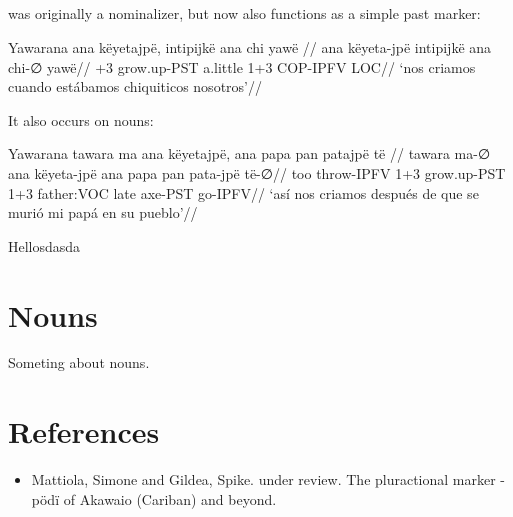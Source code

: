 \documentclass{article}
\begin{document}
\subsection{}

 was originally a nominalizer, but now also functions as a
simple past marker:

 Yawarana 
\begingl
\glpreamble ana këyetajpë, intipijkë ana chi yawë //
\gla ana këyeta-jpë intipijkë ana chi-∅ yawë//
+3 grow.up-PST a.little 1+3 COP-IPFV LOC//
\glft ‘nos criamos cuando estábamos chiquiticos nosotros’//  
\endgl 
\xe

It also occurs on nouns:

 Yawarana 
\begingl
\glpreamble tawara ma ana këyetajpë, ana papa pan patajpë të //
\gla tawara ma-∅ ana këyeta-jpë ana papa pan pata-jpë të-∅//
\glb too throw-IPFV 1+3 grow.up-PST 1+3 father:VOC late axe-PST go-IPFV//
\glft ‘así nos criamos después de que se murió mi papá en su pueblo’//  
\endgl 
\xe

Hellosdasda

\section{Nouns}

Someting about nouns.

\section{References}

\begin{itemize}
\tightlist
\item
  Mattiola, Simone and Gildea, Spike. under review. The pluractional
  marker -pödï of Akawaio (Cariban) and beyond.
\end{itemize}

% 
% 
% 
% 
% 
% 
% 
% 
% 
% 
% 
\end{document}
